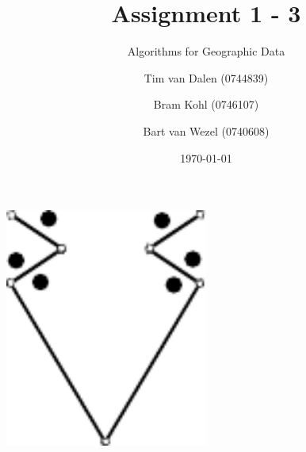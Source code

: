 \documentclass{beamer}
\title{Assignment 1 -  3}
\subtitle{Algorithms for Geographic Data}
\author[Dalen, Kohl, Wezel]{
	Tim van Dalen (0744839)
	\and
	Bram Kohl (0746107)
	\and
	Bart van Wezel (0740608)
}
\institute[Eindhoven University of Technology] %
{
    WIS\\
	Eindhoven University of Technology
}
\date{\today}
\begin{document}
	\begin{frame}
		\titlepage
	\end{frame}
	
	\begin{frame}
		\centering
		\def\svgwidth{0.7\textwidth}
		
	\end{frame}
	
	\begin{frame}
		\centering
		\def\svgwidth{0.7\textwidth}
		
	\end{frame}
	
	\begin{frame}
		\centering
		\includegraphics[width=0.5\textwidth]{img/example1.pdf}
	\end{frame}
\end{document}
